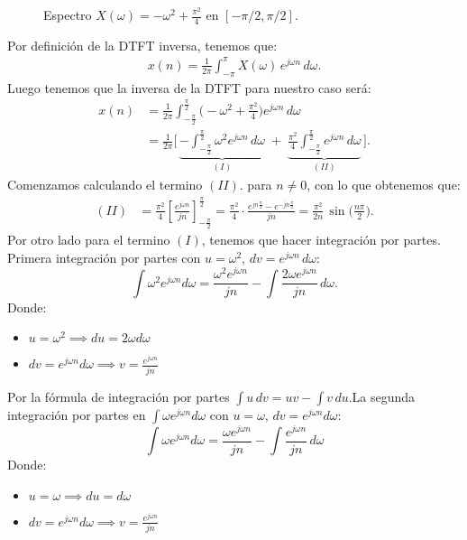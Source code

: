\documentclass[
  11pt,
  letterpaper,
   addpoints,
   answers
  ]{exam}
\begin{document}
\begin{questions}
\begin{solution}
\begin{figure}[H]
\begin{tikzpicture}[scale=1.2]
\end{tikzpicture}
\caption{Espectro $X(\omega)=-\omega^2+\tfrac{\pi^2}{4}$ en $[-\pi/2,\pi/2]$.}
\end{figure}
Por definición de la DTFT inversa, tenemos que:
\begin{align}
  x(n)= \frac{1}{2\pi}\int_{-\pi}^{\pi}X(\omega)\,e^{j\omega n}\,d\omega.
\end{align}
Luego tenemos que la inversa de la DTFT para nuestro caso será:
\begin{align}
x(n)&=\frac{1}{2\pi}\int_{-\frac{\pi}{2}}^{\frac{\pi}{2}}\Big(-\omega^2+\frac{\pi^2}{4}\Big)e^{j\omega n}\,d\omega\\
&=\frac{1}{2\pi}\Big[\,\underbrace{-\!\int_{-\frac{\pi}{2}}^{\frac{\pi}{2}}\omega^2 e^{j\omega n}\,d\omega}_{(I)}\;
+\;\underbrace{\frac{\pi^2}{4}\!\int_{-\frac{\pi}{2}}^{\frac{\pi}{2}} e^{j\omega n}\,d\omega}_{(II)}\,\Big].
\end{align}
Comenzamos calculando el termino $(II)$. para $n\neq 0$, con lo que obtenemos que:
\begin{align*}
(II)&=\frac{\pi^2}{4}\left[\frac{e^{j\omega n}}{j n}\right]_{-\frac{\pi}{2}}^{\frac{\pi}{2}}
=\frac{\pi^2}{4}\cdot\frac{e^{j n\frac{\pi}{2}}-e^{-j n\frac{\pi}{2}}}{j n}
=\frac{\pi^2}{2n}\,\sin\!\Big(\frac{n\pi}{2}\Big).
\end{align*}
Por otro lado para el termino $(I)$, tenemos que hacer integración por partes. Primera integración por partes con $u=\omega^2$, $dv=e^{j\omega n}\,d\omega$:
\[
\int \omega^2 e^{j\omega n}d\omega=\frac{\omega^2 e^{j\omega n}}{j n}-\int \frac{2\omega e^{j\omega n}}{j n}\,d\omega.
\]
Donde:
\begin{itemize}
  \item $u=\omega^2 \implies du=2\omega d\omega$
  \item $dv=e^{j\omega n}d\omega \implies v=\frac{e^{j\omega n}}{j n}$
\end{itemize}
Por la fórmula de integración por partes $\int u\,dv = uv - \int v\,du$.La segunda integración por partes en $\displaystyle \int \omega e^{j\omega n}d\omega$ con $u=\omega$, $dv=e^{j\omega n}d\omega$:
\[
\int \omega e^{j\omega n}d\omega=\frac{\omega e^{j\omega n}}{j n}-\int \frac{e^{j\omega n}}{j n}\,d\omega
\]
Donde:
\begin{itemize}
  \item $u=\omega \implies du=d\omega$
  \item $dv=e^{j\omega n}d\omega \implies v=\frac{e^{j\omega n}}{j n}$
\end{itemize}

\end{solution}
\end{questions}
\end{document}
